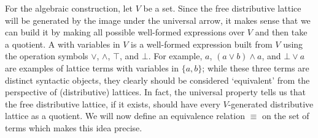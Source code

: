   For the algebraic construction, let $V$ be a set. Since the free distributive lattice will be generated by the image under the universal arrow, it makes sense that we can build it by making all possible well-formed expressions over $V$ and then take a quotient. A  with variables in $V$ is a well-formed expression built from $V$ using the operation symbols $\vee$, $\wedge$, $\top$, and $\bot$. For example, $a$, $(a \vee b) \wedge a$, and $\bot \vee a$ are examples of lattice terms with variables in $\{a,b\}$; while these three terms are distinct syntactic objects, they clearly should be considered `equivalent' from the perspective of (distributive) lattices. In fact, the universal property tells us that the free distributive lattice, if it exists, should have every $V$-generated distributive lattice as a quotient. We will now define an equivalence relation $\equiv$ on the set of terms which makes this idea precise.
  
